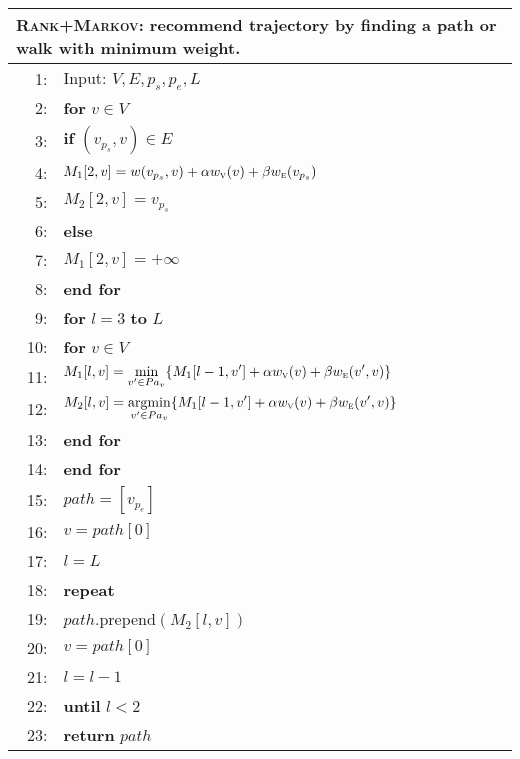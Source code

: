 \begin{table}
\centering
\small
\begin{tabular}{rl}
\hline
\multicolumn{2}{l}{\textsc{Rank+Markov}: recommend trajectory by finding a path or walk with minimum weight.} \\
\hline
 1:& Input: $V, E, p_s, p_e, L$ \\
 2:&\textbf{for} $v \in V$ \\
 3:&\hspace{6pt}\textbf{if} $(v_{p_s}, v) \in E$ \\
 4:&\hspace{12pt}   $M_1[2, v] = w(v_{p_s}, v) + \alpha w_{\textsc{v}}(v) + \beta w_{\textsc{e}}(v_{p_s})$ \\
 5:&\hspace{12pt}   $M_2[2, v] = v_{p_s}$ \\
 6:&\hspace{6pt}\textbf{else} \\
 7:&\hspace{12pt}   $M_1[2, v] = +\infty$ \\
 8:&\textbf{end for} \\
 9:&\textbf{for} $l=3$ \textbf{to} $L$ \\
10:&\hspace{6pt}\textbf{for} $v \in V$ \\
11:&\hspace{12pt}   \(\displaystyle M_1[l, v] = \min_{v' \in Pa_v} \{ M_1[l-1, v'] +
                                                \alpha w_{\textsc{v}}(v) + \beta w_{\textsc{e}}(v', v) \} \) \\
12:&\hspace{12pt}   \(\displaystyle M_2[l, v] = \operatorname*{argmin}_{v' \in Pa_v} \{ M_1[l-1, v'] +
                                                \alpha w_{\textsc{v}}(v) + \beta w_{\textsc{e}}(v', v) \} \)\\
13:&\hspace{6pt}\textbf{end for} \\
14:&\textbf{end for} \\
15:&$path = [v_{p_e}]$ \\
16:&$v = path[0]$ \\
17:&$l = L$ \\
18:&\textbf{repeat} \\
19:&\hspace{6pt}$path$.prepend$(M_2[l, v])$ \\
20:&\hspace{6pt}$v = path[0]$ \\
21:&\hspace{6pt}$l = l - 1$ \\
22:&\textbf{until} $l < 2$ \\
23:&\textbf{return} $path$ \\
\hline
\end{tabular}
\end{table}

